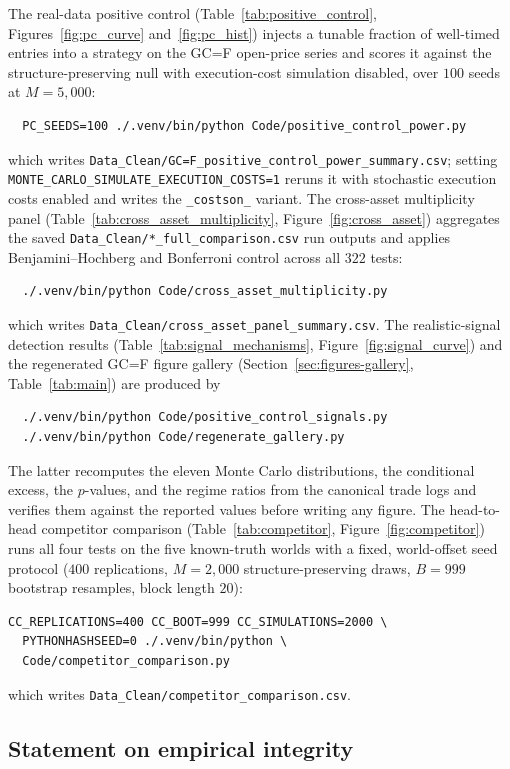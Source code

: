 \documentclass[preprint,12pt]{elsarticle}
\theoremstyle{definition}
\begin{document}
The real-data positive control (Table~\ref{tab:positive_control}, Figures~\ref{fig:pc_curve} and~\ref{fig:pc_hist}) injects a tunable fraction of well-timed entries into a strategy on the GC=F open-price series and scores it against the structure-preserving null with execution-cost simulation disabled, over $100$ seeds at $M=5{,}000$:
\begin{verbatim}
  PC_SEEDS=100 ./.venv/bin/python Code/positive_control_power.py
\end{verbatim}
which writes \texttt{Data\_Clean/\allowbreak GC=F\_positive\_control\_power\_summary.csv}; setting \texttt{MONTE\_CARLO\_SIMULATE\_EXECUTION\_COSTS=1} reruns it with stochastic execution costs enabled and writes the \texttt{\_costson\_} variant. The cross-asset multiplicity panel (Table~\ref{tab:cross_asset_multiplicity}, Figure~\ref{fig:cross_asset}) aggregates the saved \texttt{Data\_Clean/*\_full\_comparison.csv} run outputs and applies Benjamini--Hochberg and Bonferroni control across all $322$ tests:
\begin{verbatim}
  ./.venv/bin/python Code/cross_asset_multiplicity.py
\end{verbatim}
which writes \texttt{Data\_Clean/cross\_asset\_panel\_summary.csv}. The realistic-signal detection results (Table~\ref{tab:signal_mechanisms}, Figure~\ref{fig:signal_curve}) and the regenerated GC=F figure gallery (Section~\ref{sec:figures-gallery}, Table~\ref{tab:main}) are produced by
\begin{verbatim}
  ./.venv/bin/python Code/positive_control_signals.py
  ./.venv/bin/python Code/regenerate_gallery.py
\end{verbatim}
The latter recomputes the eleven Monte Carlo distributions, the conditional excess, the $p$-values, and the regime ratios from the canonical trade logs and verifies them against the reported values before writing any figure. The head-to-head competitor comparison (Table~\ref{tab:competitor}, Figure~\ref{fig:competitor}) runs all four tests on the five known-truth worlds with a fixed, world-offset seed protocol ($400$ replications, $M=2{,}000$ structure-preserving draws, $B=999$ bootstrap resamples, block length $20$):
\begin{verbatim}
CC_REPLICATIONS=400 CC_BOOT=999 CC_SIMULATIONS=2000 \
  PYTHONHASHSEED=0 ./.venv/bin/python \
  Code/competitor_comparison.py
\end{verbatim}
which writes \texttt{Data\_Clean/competitor\_comparison.csv}.

\subsection{Statement on empirical integrity}
\end{document}
